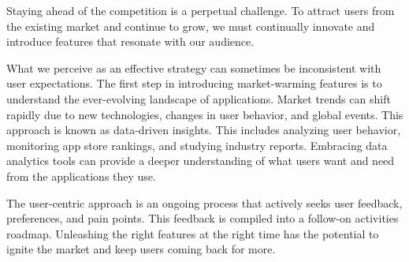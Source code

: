 
Staying ahead of the competition is a perpetual challenge. To attract users from the existing market and continue to 
grow, we must continually innovate and introduce features that resonate with our audience. 

What we perceive as an effective strategy can sometimes be inconsistent with user expectations. The first step in 
introducing market-warming features is to understand the ever-evolving landscape of applications. Market trends can 
shift rapidly due to new technologies, changes in user behavior, and global events. This approach is known as 
data-driven insights. This includes analyzing user behavior, monitoring app store rankings, and studying industry 
reports. Embracing data analytics tools can provide a deeper understanding of what users want and need from the 
applications they use.

The user-centric approach is an ongoing process that actively seeks user feedback, preferences, and pain points. This 
feedback is compiled into a follow-on activities roadmap. Unleashing the right features at the right time has the 
potential to ignite the market and keep users coming back for more.
